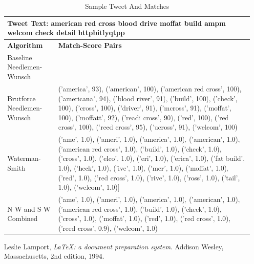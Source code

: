\documentclass[11pt,a4paper]{article}
\begin{document}
\begin{table} [t]
\caption{Sample Tweet And Matches}
\begin{center}
	\begin{tabular}{| p{5.5cm} | p{10cm} |}
	\hline
	\multicolumn{2}{|p{15.5cm}|}{\textbf{Tweet Text:} american red cross blood drive moffat build ampm welcom check detail httpbitlyqtpp
} \\
	\hline
	\textbf{Algorithm} & \textbf{Match-Score Pairs}\\
	\hline
	Baseline Needlemen-Wunsch & \\
	\hline
	Brutforce Needlemen-Wunsch & ('america', 93), ('american', 100), ('american red cross', 100), ('americana', 94), ('blood river', 91), ('build', 100), ('check', 100), ('cross', 100), ('driver', 91), ('mcross', 91), ('moffat', 100), ('moffatt', 92), ('readi cross', 90), ('red', 100), ('red cross', 100), ('reed cross', 95), ('ucross', 91), ('welcom', 100)\\
	\hline
	Waterman-Smith & ('ame', 1.0), ('ameri', 1.0), ('america', 1.0), ('american', 1.0), ('american red cross', 1.0), ('build', 1.0), ('check', 1.0), ('cross', 1.0), ('elco', 1.0), ('eri', 1.0), ('erica', 1.0), ('fat build', 1.0), ('heck', 1.0), ('ive', 1.0), ('mer', 1.0), ('moffat', 1.0), ('red', 1.0), ('red cross', 1.0), ('rive', 1.0), ('ross', 1.0), ('tail', 1.0), ('welcom', 1.0)]\\
	\hline
	N-W and S-W Combined & ('ame', 1.0), ('ameri', 1.0), ('america', 1.0), ('american', 1.0), ('american red cross', 1.0), ('build', 1.0), ('check', 1.0), ('cross', 1.0), ('moffat', 1.0), ('red', 1.0), ('red cross', 1.0), ('reed cross', 0.9), ('welcom', 1.0)\\
	\hline
	\end{tabular}
\end{center}
\label{table:alg-table2}
\end{table}

\begin{thebibliography}{9}

  Leslie Lamport,
  \emph{\LaTeX: a document preparation system}.
  Addison Wesley, Massachusetts,
  2nd edition,
  1994.

\end{thebibliography}
\end{document}
